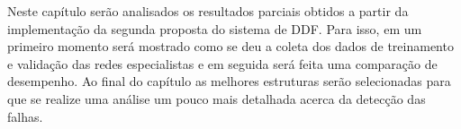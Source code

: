 \label{cap:resultados}



% 
%
%





\begin{comment}
Neste capítulo será realizada uma análise comparativa dos resultados obtidos nas
duas propostas do sistema de DDF. Ao final, do capítulo a melhor estrutura será
escolhida para que seja feita uma análise mais detalhada dos resultados.
\end{comment}

Neste capítulo serão analisados os resultados parciais obtidos a partir da
implementação da segunda proposta do sistema de DDF. Para isso, em um primeiro
momento será mostrado como se deu a coleta dos dados de treinamento e validação
das redes especialistas e em seguida será feita uma comparação de desempenho. Ao
final do capítulo as melhores estruturas serão selecionadas para que se realize
uma análise um pouco mais detalhada acerca da detecção das falhas.

